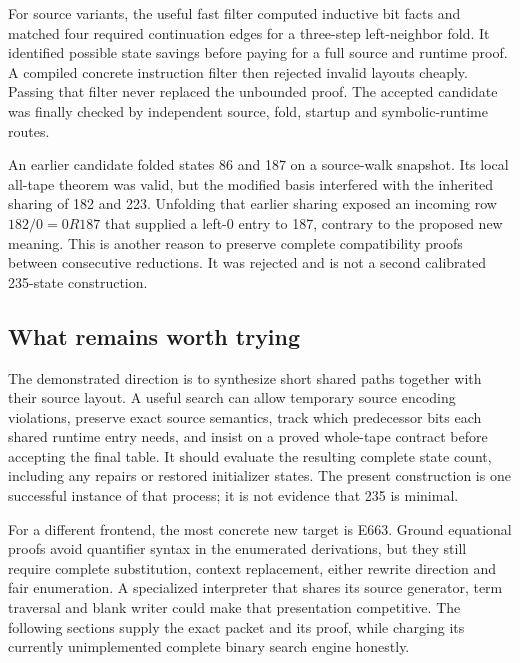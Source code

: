 For source variants, the useful fast filter computed inductive bit facts
and matched four required continuation edges for a three-step
left-neighbor fold. It identified possible state savings before paying
for a full source and runtime proof. A compiled concrete instruction
filter then rejected invalid layouts cheaply. Passing that filter never
replaced the unbounded proof. The accepted candidate was finally checked
by independent source, fold, startup and symbolic-runtime routes.

An earlier candidate folded states 86 and 187 on a source-walk snapshot.
Its local all-tape theorem was valid, but the modified basis interfered
with the inherited sharing of 182 and 223. Unfolding that earlier sharing
exposed an incoming row $182/0=0R187$ that supplied a left-0 entry to
187, contrary to the proposed new meaning. This is another reason to
preserve complete compatibility proofs between consecutive reductions.
It was rejected and is not a second calibrated 235-state construction.

\subsection{What remains worth trying}

The demonstrated direction is to synthesize short shared paths together
with their source layout. A useful search can allow temporary source
encoding violations, preserve exact source semantics, track which
predecessor bits each shared runtime entry needs, and insist on a proved
whole-tape contract before accepting the final table. It should evaluate
the resulting complete state count, including any repairs or restored
initializer states. The present construction is one successful instance
of that process; it is not evidence that 235 is minimal.

For a different frontend, the most concrete new target is E663. Ground
equational proofs avoid quantifier syntax in the enumerated derivations,
but they still require complete substitution, context replacement, either
rewrite direction and fair enumeration. A specialized interpreter that
shares its source generator, term traversal and blank writer could make
that presentation competitive. The following sections supply the exact
packet and its proof, while charging its currently unimplemented
complete binary search engine honestly.

